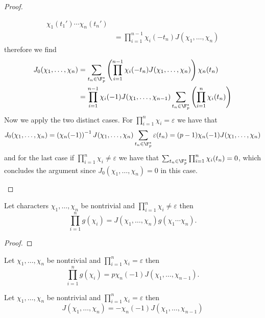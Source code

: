 \begin{proof}
\begin{enumerate}[i.]
\begin{align*}
             \chi_1(t_1') \cdots \chi_n(t_n') \\
             &= \prod_{i=1}^{n-1} \chi_i(-t_n) J(\chi_1, \dots, \chi_n)
         \end{align*}
         therefore we find 
         \begin{align*}
            J_0(\chi_1, \dots, \chi_n) 
            &= \sum_{t_n \in \F_p^{\ast}} \left( \prod_{i=1}^{n-1} \chi_i(-t_n)
            J(\chi_1,\dots, \chi_n)\right) \chi_n(t_n) \\
            &= \prod_{i=1}^{n-1} \chi_i(-1) J(\chi_1,\dots,\chi_{n-1}) \sum_{t_n
            \in \F_p^\ast}\left( \prod_{i=1}^{n} \chi_i(t_n) \right) 
         \end{align*}
         Now we apply the two distinct cases. For \(\prod_{i=1}^{n} \chi_i =
         \varepsilon\) we have that 
         \[
            J_0(\chi_1,\dots,\chi_n) = \left( \chi_n(-1) \right)^{-1} J(\chi_1,
            \dots, \chi_n) \sum_{t_n \in \F_p^\ast} \varepsilon(t_n) = (p-1)
            \chi_n(-1) J(\chi_1,\dots,\chi_n)
         \]
         and for the last case if \(\prod_{i = 1}^n \chi_i \neq  \varepsilon\)
         we have that \(\sum_{t_n \in \F_p^\ast} \prod_{i=1}^n \chi_i(t_n) =
         0\), which concludes the argument since \(J_0(\chi_1, \dots, \chi_n)=
         0\) in this case.
   \end{enumerate}
\end{proof}

\begin{theorem}
   Let characters \(\chi_1, \dots, \chi_n\) be nontrivial and  \(\prod_{i =
   1}^{n} \chi_i \neq  \varepsilon\) then 
   \[
      \prod_{i=1}^{n} g(\chi_i) = J(\chi_1, \dots, \chi_n) g(\chi_1 \cdots
      \chi_n).
   \] 
\end{theorem}

\begin{proof}
\end{proof}

\begin{corollary}
   Let \(\chi_1,\dots,\chi_n\) be nontrivial and \(\prod_{i=1}^n \chi_i = 
   \varepsilon\) then  
   \[
      \prod_{i=1}^n g(\chi_i) = p\chi_n(-1) J(\chi_1,\dots,\chi_{n-1}).
   \] 
\end{corollary}

\begin{corollary}
   Let \(\chi_1,\dots,\chi_n\) be nontrivial and \(\prod_{i=1}^n \chi_i = 
   \varepsilon\) then  
   \[
      J(\chi_1, \dots, \chi_n) = -\chi_n(-1) J(\chi_1,\dots,\chi_{n-1})
   \] 
\end{corollary}

